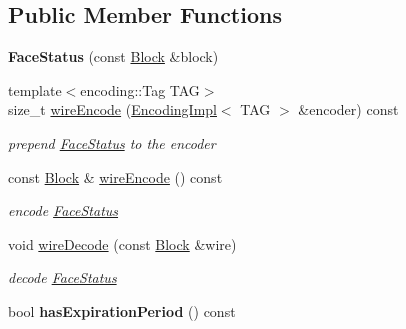 \subsection*{Public Member Functions}
\begin{DoxyCompactItemize}
\item 
{\bfseries Face\+Status} (const \hyperlink{classndn_1_1Block}{Block} \&block)\hypertarget{classndn_1_1nfd_1_1FaceStatus_a7b0179f29a62011b6cc5bf0da2700e75}{}\label{classndn_1_1nfd_1_1FaceStatus_a7b0179f29a62011b6cc5bf0da2700e75}

\item 
{\footnotesize template$<$encoding\+::\+Tag T\+AG$>$ }\\size\+\_\+t \hyperlink{classndn_1_1nfd_1_1FaceStatus_ae41d7afd1f7b8e4c20f06adc14e2dd45}{wire\+Encode} (\hyperlink{classndn_1_1encoding_1_1EncodingImpl}{Encoding\+Impl}$<$ T\+AG $>$ \&encoder) const\hypertarget{classndn_1_1nfd_1_1FaceStatus_ae41d7afd1f7b8e4c20f06adc14e2dd45}{}\label{classndn_1_1nfd_1_1FaceStatus_ae41d7afd1f7b8e4c20f06adc14e2dd45}

\begin{DoxyCompactList}\small\item\em prepend \hyperlink{classndn_1_1nfd_1_1FaceStatus}{Face\+Status} to the encoder \end{DoxyCompactList}\item 
const \hyperlink{classndn_1_1Block}{Block} \& \hyperlink{classndn_1_1nfd_1_1FaceStatus_a09bfc1dfcfa261aa376666486642a2a8}{wire\+Encode} () const\hypertarget{classndn_1_1nfd_1_1FaceStatus_a09bfc1dfcfa261aa376666486642a2a8}{}\label{classndn_1_1nfd_1_1FaceStatus_a09bfc1dfcfa261aa376666486642a2a8}

\begin{DoxyCompactList}\small\item\em encode \hyperlink{classndn_1_1nfd_1_1FaceStatus}{Face\+Status} \end{DoxyCompactList}\item 
void \hyperlink{classndn_1_1nfd_1_1FaceStatus_a705522d2cd07d838e91c96bbc893604d}{wire\+Decode} (const \hyperlink{classndn_1_1Block}{Block} \&wire)\hypertarget{classndn_1_1nfd_1_1FaceStatus_a705522d2cd07d838e91c96bbc893604d}{}\label{classndn_1_1nfd_1_1FaceStatus_a705522d2cd07d838e91c96bbc893604d}

\begin{DoxyCompactList}\small\item\em decode \hyperlink{classndn_1_1nfd_1_1FaceStatus}{Face\+Status} \end{DoxyCompactList}\item 
bool {\bfseries has\+Expiration\+Period} () const\hypertarget{classndn_1_1nfd_1_1FaceStatus_ac6b54950e9798b05257b0a457a8b3b5c}{}\label{classndn_1_1nfd_1_1FaceStatus_ac6b54950e9798b05257b0a457a8b3b5c}


\end{DoxyCompactItemize}
